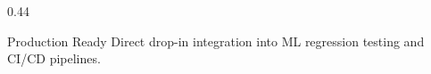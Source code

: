 \begin{frame}[fragile]
\begin{columns}[T]
\begin{column}{0.44\textwidth}
      \vspace{0.1cm}
      \begin{successcard}{Production Ready}
        \scriptsize Direct drop-in integration into ML regression testing and CI/CD pipelines.
      \end{successcard}
    \end{column}
  \end{columns}
\end{frame}
